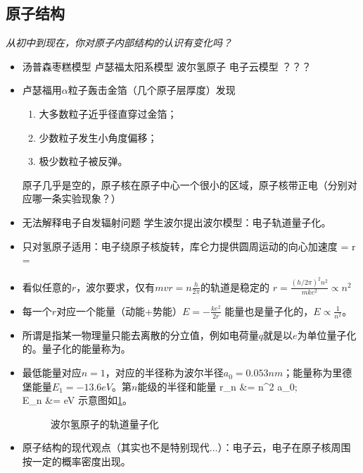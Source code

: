 \documentclass[a4paper,9pt]{ctexart}
\begin{document}
\subsection{原子结构}
\emph{从初中到现在，你对原子内部结构的认识有变化吗？}
\begin{itemize}
\item
汤普森枣糕模型 \so 卢瑟福太阳系模型 \so 波尔氢原子 \so 电子云模型 \so ？？？
\item
卢瑟福用$\alpha$粒子轰击金箔（几个原子层厚度）发现
\begin{enumerate}
\item
大多数粒子近乎径直穿过金箔；
\item
少数粒子发生小角度偏移；
\item
极少数粒子被反弹。
\end{enumerate}
\so 原子几乎是空的，原子核在原子中心一个很小的区域，原子核带正电（分别对应哪一条实验现象？）
\item
无法解释电子自发辐射问题 \so 学生波尔提出波尔模型：电子轨道量子化。
\item
只对氢原子适用：电子绕原子核旋转，库仑力提供圆周运动的向心加速度
\beq
{} =  \quad \Rightarrow \quad r = 
\eeq
\item
看似任意的$r$，波尔要求，仅有$mvr = n \frac{h}{2\pi}$的轨道是稳定的 \so $r = \frac{(h/2\pi)^2 n^2}{mke^2} \propto n^2$
\item
每一个$r$对应一个能量（动能+势能）$E = -\frac{ke^2}{2r}$ \so 能量也是量子化的，$E \propto \frac{1}{n^2}$。
\item
所谓是指某一物理量只能去离散的分立值，例如电荷量$q$就是以$e$为单位量子化的。量子化的能量称为。
\item
最低能量对应$n=1$，对应的半径称为波尔半径$a_0 = 0.053\unit{nm}$；能量称为里德堡能量$E_1 = -13.6\unit{eV}$。\so 第$n$能级的半径和能量
\bea
r_n &= n^2 a_0;\\
E_n &=  \unit{eV}
\eea
示意图如\cref{bohrorbit}。
\begin{figure}[H]
\centering
{}
\caption{波尔氢原子的轨道量子化\label{bohrorbit}}
\end{figure}
\item
原子结构的现代观点（其实也不是特别现代...）：电子云，电子在原子核周围按一定的概率密度出现。
\end{itemize}
\end{document}
